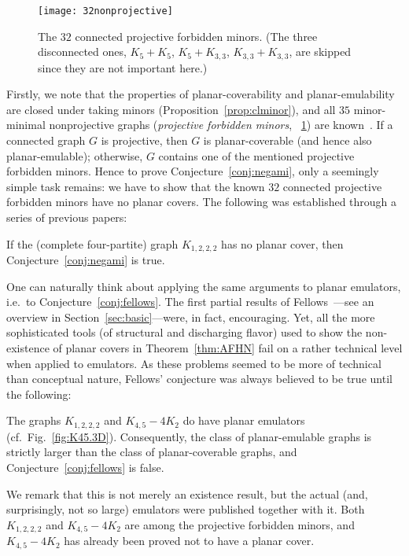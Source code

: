 \documentclass[envcountsect,envcountsame]{llncs}
\begin{document}
\begin{figure}[tb]
\centering
\texttt{[image: 32nonprojective]}
\caption{The $32$ connected projective forbidden minors. (The three
disconnected ones, $K_5+K_5$, $K_5+K_{3,3}$, $K_{3,3}+K_{3,3}$,
are skipped since they are not important here.)}
\label{fig:32nonproj}
\end{figure}

Firstly, we note that the properties of planar-coverability and planar-emula\-bility
are closed under taking minors (Proposition~\ref{prop:clminor}), 
and all $35$ minor-minimal nonprojective graphs ({\em projective forbidden minors},
\figurename~\ref{fig:32nonproj}) are known~\cite{cit:archd-pp}.
If a connected graph $G$ is projective, then $G$ is planar-coverable (and 
hence also planar-emulable); otherwise, $G$ contains one of the mentioned 
projective forbidden minors. 
Hence to prove Conjecture~\ref{conj:negami}, only a seemingly simple task
remains: we have to show that the known $32$ connected projective forbidden
minors have no planar covers.
The following was established through a series of previous papers:

\begin{theorem}
\label{thm:AFHN}
If the (complete four-partite) graph $K_{1,2,2,2}$ has no planar cover,
then Conjecture~\ref{conj:negami} is true.
\end{theorem}

One can naturally think about applying the same arguments to planar emulators,
i.e.\ to Conjecture~\ref{conj:fellows}.
The first partial results of Fellows~\cite{cit:femul}---see an overview in Section~\ref{sec:basic}---were, in fact, encouraging.
Yet, all the more sophisticated tools (of structural and discharging
flavor) used to show the non-existence of planar covers in Theorem~\ref{thm:AFHN}
fail on a rather technical level when applied to emulators. 
As these problems seemed to be more of technical than conceptual nature, 
Fellows' conjecture was always believed to be true until the following:


\begin{theorem}
\label{thm:rieck}\hfill
The graphs $K_{1,2,2,2}$ and \mbox{$K_{4,5}-4K_2$}
do have planar emulators (cf.\ Fig.~\ref{fig:K45.3D}).
Consequently, the class of planar-emulable graphs is strictly larger than
the class of planar-coverable graphs, and Conjecture~\ref{conj:fellows} is
false.
\end{theorem}
We remark that this is not merely an existence result, but the actual
(and, surprisingly, not so large) emulators were published together with it.
Both $K_{1,2,2,2}$ and \mbox{$K_{4,5}-4K_2$} are among the
projective forbidden minors, and \mbox{$K_{4,5}-4K_2$} has already 
been proved not to have a planar cover.
\end{document}

